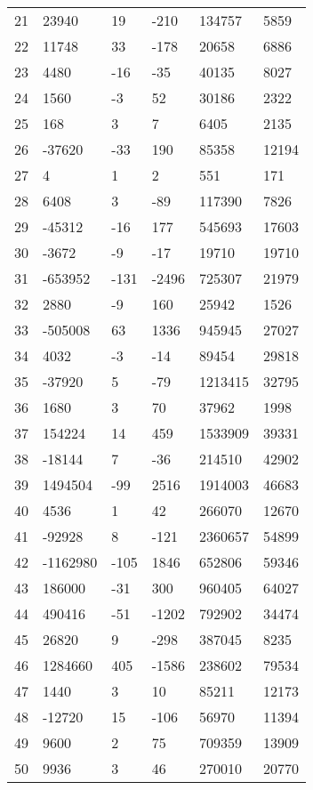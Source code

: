 \documentclass{amsart}
\begin{document}
\begin{longtable}{llllll}
21 & 23940 & 19 & -210 & 134757 & 5859\\
22 & 11748 & 33 & -178 & 20658 & 6886\\
23 & 4480 & -16 & -35 & 40135 & 8027\\
24 & 1560 & -3 & 52 & 30186 & 2322\\
25 & 168 & 3 & 7 & 6405 & 2135\\
26 & -37620 & -33 & 190 & 85358 & 12194\\
27 & 4 & 1 & 2 & 551 & 171\\
28 & 6408 & 3 & -89 & 117390 & 7826\\
29 & -45312 & -16 & 177 & 545693 & 17603\\
30 & -3672 & -9 & -17 & 19710 & 19710\\
31 & -653952 & -131 & -2496 & 725307 & 21979\\
32 & 2880 & -9 & 160 & 25942 & 1526\\
33 & -505008 & 63 & 1336 & 945945 & 27027\\
34 & 4032 & -3 & -14 & 89454 & 29818\\
35 & -37920 & 5 & -79 & 1213415 & 32795\\
36 & 1680 & 3 & 70 & 37962 & 1998\\
37 & 154224 & 14 & 459 & 1533909 & 39331\\
38 & -18144 & 7 & -36 & 214510 & 42902\\
39 & 1494504 & -99 & 2516 & 1914003 & 46683\\
40 & 4536 & 1 & 42 & 266070 & 12670\\
41 & -92928 & 8 & -121 & 2360657 & 54899\\
42 & -1162980 & -105 & 1846 & 652806 & 59346\\
43 & 186000 & -31 & 300 & 960405 & 64027\\
44 & 490416 & -51 & -1202 & 792902 & 34474\\
45 & 26820 & 9 & -298 & 387045 & 8235\\
46 & 1284660 & 405 & -1586 & 238602 & 79534\\
47 & 1440 & 3 & 10 & 85211 & 12173\\
48 & -12720 & 15 & -106 & 56970 & 11394\\
49 & 9600 & 2 & 75 & 709359 & 13909\\
50 & 9936 & 3 & 46 & 270010 & 20770\\
\hline
\end{longtable}

\clearpage
\end{document}
